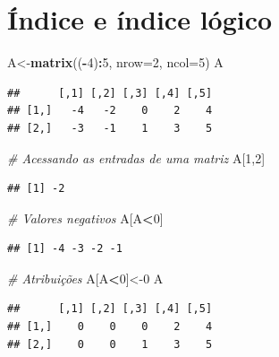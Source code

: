 \documentclass[
]{book}
\newenvironment{Shaded}{\begin{snugshade}}{\end{snugshade}}
\newcommand{\AttributeTok}[1]{\textcolor[rgb]{0.13,0.29,0.53}{#1}}
\newcommand{\CommentTok}[1]{\textcolor[rgb]{0.56,0.35,0.01}{\textit{#1}}}
\newcommand{\DecValTok}[1]{\textcolor[rgb]{0.00,0.00,0.81}{#1}}
\newcommand{\FunctionTok}[1]{\textcolor[rgb]{0.13,0.29,0.53}{\textbf{#1}}}
\newcommand{\NormalTok}[1]{#1}
\newcommand{\OtherTok}[1]{\textcolor[rgb]{0.56,0.35,0.01}{#1}}
\newcommand{\SpecialCharTok}[1]{\textcolor[rgb]{0.81,0.36,0.00}{\textbf{#1}}}
\theoremstyle{definition}
\theoremstyle{definition}
\theoremstyle{definition}
\theoremstyle{definition}
\theoremstyle{remark}
\begin{document}
\section{Índice e índice lógico}\label{uxedndice-e-uxedndice-luxf3gico}

\begin{Shaded}
\begin{Highlighting}[]
\NormalTok{A}\OtherTok{\textless{}{-}}\FunctionTok{matrix}\NormalTok{((}\SpecialCharTok{{-}}\DecValTok{4}\NormalTok{)}\SpecialCharTok{:}\DecValTok{5}\NormalTok{, }\AttributeTok{nrow=}\DecValTok{2}\NormalTok{, }\AttributeTok{ncol=}\DecValTok{5}\NormalTok{)}
\NormalTok{A}
\end{Highlighting}
\end{Shaded}

\begin{verbatim}
##      [,1] [,2] [,3] [,4] [,5]
## [1,]   -4   -2    0    2    4
## [2,]   -3   -1    1    3    5
\end{verbatim}

\begin{Shaded}
\begin{Highlighting}[]
\CommentTok{\# Acessando as entradas de uma matriz}
\NormalTok{A[}\DecValTok{1}\NormalTok{,}\DecValTok{2}\NormalTok{]}
\end{Highlighting}
\end{Shaded}

\begin{verbatim}
## [1] -2
\end{verbatim}

\begin{Shaded}
\begin{Highlighting}[]
\CommentTok{\# Valores negativos }
\NormalTok{A[A}\SpecialCharTok{\textless{}}\DecValTok{0}\NormalTok{]}
\end{Highlighting}
\end{Shaded}

\begin{verbatim}
## [1] -4 -3 -2 -1
\end{verbatim}

\begin{Shaded}
\begin{Highlighting}[]
\CommentTok{\# Atribuições}
\NormalTok{A[A}\SpecialCharTok{\textless{}}\DecValTok{0}\NormalTok{]}\OtherTok{\textless{}{-}}\DecValTok{0}
\NormalTok{A}
\end{Highlighting}
\end{Shaded}

\begin{verbatim}
##      [,1] [,2] [,3] [,4] [,5]
## [1,]    0    0    0    2    4
## [2,]    0    0    1    3    5
\end{verbatim}
\end{document}
